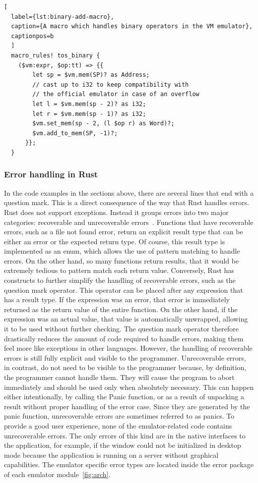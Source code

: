 \begin{lstlisting}[
  label={lst:binary-add-macro},
  caption={A macro which handles binary operators in the VM emulator},
  captionpos=b
  ]
  macro_rules! tos_binary {
    ($vm:expr, $op:tt) => {{
        let sp = $vm.mem(SP)? as Address;
        // cast up to i32 to keep compatibility with
        // the official emulator in case of an overflow
        let l = $vm.mem(sp - 2)? as i32;
        let r = $vm.mem(sp - 1)? as i32;
        $vm.set_mem(sp - 2, (l $op r) as Word)?;
        $vm.add_to_mem(SP, -1)?;
      }};
  }
\end{lstlisting}

\subsubsection{Error handling in Rust} \label{rust-error-handling}
In the code examples in the sections above, there are several lines that end with a question mark. This is a direct consequence of the way that Rust handles errors.
Rust does not support exceptions. Instead it groups errors into two major categories: recoverable and unrecoverable errors~\cite[Chapter~9]{klabnik2019rust}.
Functions that have recoverable errors, such as a file not found error, return an explicit result type that can be either an error or the expected return type.
Of course, this result type is implemented as an enum, which allows the use of pattern matching to handle errors.
On the other hand, so many functions return results, that it would be extremely tedious to pattern match each return value.
Conversely, Rust has constructs to further simplify the handling of recoverable errors, such as the question mark operator.
This operator can be placed after any expression that has a result type. If the expression was an error, that error is immediately returned as the return value of the entire function. On the other hand, if the expression was an actual value, that value is automatically unwrapped, allowing it to be used without further checking.
The question mark operator therefore drastically reduces the amount of code required to handle errors, making them feel more like exceptions in other languages. However, the handling of recoverable errors is still fully explicit and visible to the programmer.
Unrecoverable errors, in contrast, do not need to be visible to the programmer because, by definition, the programmer cannot handle them.
They will cause the program to abort immediately and should be used only when absolutely necessary.
This can happen either intentionally, by calling the Panic function, or as a result of unpacking a result without proper handling of the error case.
Since they are generated by the panic function, unrecoverable errors are sometimes referred to as panics.
To provide a good user experience, none of the emulator-related code contains unrecoverable errors. The only errors of this kind are in the native interfaces to the application, for example, if the window could not be initialized in desktop mode because the application is running on a server without graphical capabilities.
The emulator specific error types are located inside the error package of each emulator module~\ref{fig:arch}.

